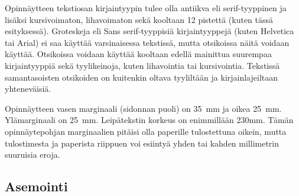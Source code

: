 \documentclass[english,12pt,a4paper,pdftex,sci,utf8]{aaltothesis}
\begin{document}
Opinn\"aytteen tekstiosan kirjaintyypin tulee olla antiikva eli
serif\--tyyp\-pi\-nen ja lis\"aksi kursivoimaton, lihavoimaton sek\"a kooltaan 12
pistett\"a (kuten t\"ass\"a esityksess\"a). Groteskeja eli \textsf{Sans
  serif}-tyyppisi\"a kirjaintyyppej\"a (kuten Helvetica tai Arial) ei saa
k\"aytt\"a\"a varsinaisessa tekstiss\"a, mutta otsikoissa n\"ait\"a voidaan
k\"aytt\"a\"a.  Otsikoissa voidaan k\"aytt\"a\"a kooltaan edell\"a mainittua
suurempaa kirjaintyyppi\"a sek\"a tyylikeinoja, kuten lihavointia tai
kursivointia.  Tekstiss\"a samantasoisten otsikoiden on kuitenkin oltava
tyylilt\"a\"an ja kirjainlajeiltaan yhtenev\"aisi\"a.
\begin{table}[htb]
\caption{Taulukoissa ja kuvissa kirjaintyypin voi valita
tarkoituksenmukaisesti, mutta kuva- ja taulukkoteksteiss\"a tulee
k\"aytt\"a\"a samaa kirjaintyyppi\"a kuin varsinaisessa tekstiss\"a. 
Huomaa taulukon numeroinnin sijoittuminen taulukon yl\"apuolelle. \label{taulukko1}}
\begin{center}
\end{center}
\end{table}

Opinn\"aytteen vasen marginaali (sidonnan puoli) on
35~mm %
ja oikea 25~mm. Yl\"amarginaali on 25~mm. Leip\"atekstin korkeus on
enimmill\"a\"an 230mm. T\"am\"an opinn\"aytepohjan marginaalien pit\"aisi olla
paperille tulostettuna oikein, mutta tulostimesta ja paperista
riippuen voi esiinty\"a yhden tai kahden millimetrin suuruisia eroja.
\subsection*{Asemointi}
\end{document}
